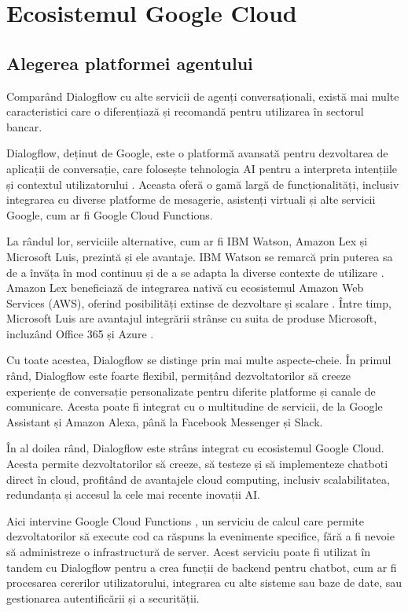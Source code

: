 \chapter{Ecosistemul Google Cloud}

\section{Alegerea platformei agentului}

Comparând Dialogflow cu alte servicii de agenți conversaționali, există mai multe caracteristici care o diferențiază și recomandă pentru utilizarea în sectorul bancar.

Dialogflow, deținut de Google, este o platformă avansată pentru dezvoltarea de aplicații de conversație, care folosește tehnologia AI pentru a interpreta intențiile și contextul utilizatorului \cite{google_dialogflow}. Aceasta oferă o gamă largă de funcționalități, inclusiv integrarea cu diverse platforme de mesagerie, asistenți virtuali și alte servicii Google, cum ar fi Google Cloud Functions.

La rândul lor, serviciile alternative, cum ar fi IBM Watson, Amazon Lex și Microsoft Luis, prezintă și ele avantaje. IBM Watson se remarcă prin puterea sa de a învăța în mod continuu și de a se adapta la diverse contexte de utilizare \cite{ibm_watson}. Amazon Lex beneficiază de integrarea nativă cu ecosistemul Amazon Web Services (AWS), oferind posibilități extinse de dezvoltare și scalare \cite{amazon_lex}. Între timp, Microsoft Luis are avantajul integrării strânse cu suita de produse Microsoft, incluzând Office 365 și Azure \cite{microsoft_luis}.

Cu toate acestea, Dialogflow se distinge prin mai multe aspecte-cheie. În primul rând, Dialogflow este foarte flexibil, permițând dezvoltatorilor să creeze experiențe de conversație personalizate pentru diferite platforme și canale de comunicare. Acesta poate fi integrat cu o multitudine de servicii, de la Google Assistant și Amazon Alexa, până la Facebook Messenger și Slack.

În al doilea rând, Dialogflow este strâns integrat cu ecosistemul Google Cloud. Acesta permite dezvoltatorilor să creeze, să testeze și să implementeze chatboti direct în cloud, profitând de avantajele cloud computing, inclusiv scalabilitatea, redundanța și accesul la cele mai recente inovații AI.

Aici intervine Google Cloud Functions \cite{google_cloud_functions}, un serviciu de calcul care permite dezvoltatorilor să execute cod ca răspuns la evenimente specifice, fără a fi nevoie să administreze o infrastructură de server. Acest serviciu poate fi utilizat în tandem cu Dialogflow pentru a crea funcții de backend pentru chatbot, cum ar fi procesarea cererilor utilizatorului, integrarea cu alte sisteme sau baze de date, sau gestionarea autentificării și a securității.

